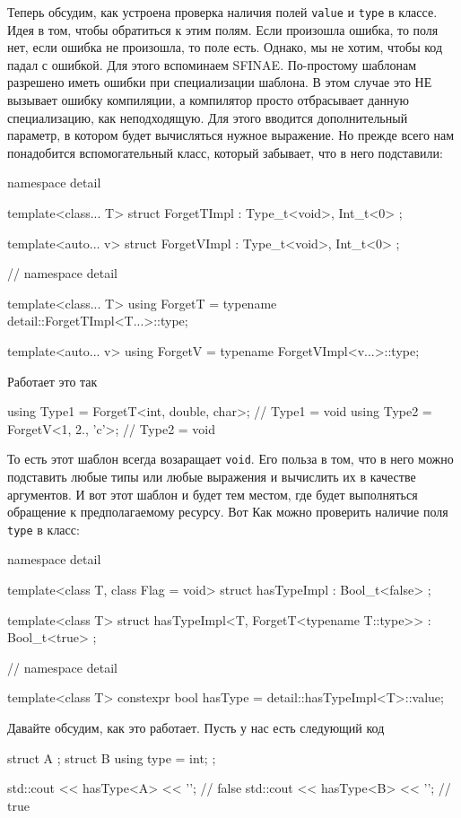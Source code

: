 Теперь обсудим, как устроена проверка наличия полей \verb"value" и \verb"type" в классе.
Идея в том, чтобы обратиться к этим полям.
Если произошла ошибка, то поля нет, если ошибка не произошла, то поле есть.
Однако, мы не хотим, чтобы код падал с ошибкой.
Для этого вспоминаем SFINAE.
По-простому шаблонам разрешено иметь ошибки при специализации шаблона.
В этом случае это НЕ вызывает ошибку компиляции, а компилятор просто отбрасывает данную специализацию, как неподходящую.
Для этого вводится дополнительный параметр, в котором будет вычисляться нужное выражение.
Но прежде всего нам понадобится вспомогательный класс, который забывает, что в него подставили:
\begin{cppcode}
namespace detail {
template<class... T>
struct ForgetTImpl : Type_t<void>, Int_t<0> {};

template<auto... v>
struct ForgetVImpl : Type_t<void>, Int_t<0> {};
} // namespace detail

template<class... T>
using ForgetT = typename detail::ForgetTImpl<T...>::type;

template<auto... v>
using ForgetV = typename ForgetVImpl<v...>::type;
\end{cppcode}
Работает это так
\begin{cppcode}
using Type1 = ForgetT<int, double, char>; // Type1 = void
using Type2 = ForgetV<1, 2., 'c'>; // Type2 = void
\end{cppcode}
То есть этот шаблон всегда возаращает \verb"void".
Его польза в том, что в него можно подставить любые типы или любые выражения и вычислить их в качестве аргументов.
И вот этот шаблон и будет тем местом, где будет выполняться обращение к предполагаемому ресурсу.
Вот Как можно проверить наличие поля \verb"type" в класс:
\begin{cppcode}
namespace detail {

template<class T, class Flag = void>
struct hasTypeImpl : Bool_t<false> {};

template<class T>
struct hasTypeImpl<T, ForgetT<typename T::type>> : Bool_t<true> {};
} // namespace detail

template<class T>
constexpr bool hasType = detail::hasTypeImpl<T>::value;
\end{cppcode}
Давайте обсудим, как это работает.
Пусть у нас есть следующий код
\begin{cppcode}
struct A {};
struct B {
  using type = int;
};

std::cout << hasType<A> << '\n'; // false
std::cout << hasType<B> << '\n';  // true
\end{cppcode}
